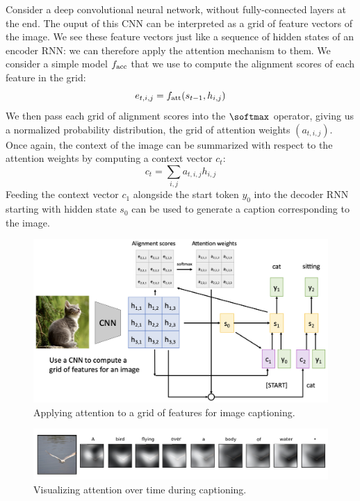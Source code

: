 Consider a deep convolutional neural network, without fully-connected layers at the end. The ouput of this CNN can be interpreted as a grid of feature vectors of the image. We see these feature vectors just like a sequence of hidden states of an encoder RNN: we can therefore apply the attention mechanism to them. We consider a simple model $f_{\textnormal{acc}}$ that we use to compute the alignment scores of each feature in the grid:
\begin{equation*}
    e_{t,i,j} = f_{\textnormal{att}}(s_{t-1}, h_{i,j})
\end{equation*}
We then pass each grid of alignment scores into the $\softmax$ operator, giving us a normalized probability distribution, the grid of attention weights $(a_{t,i,j})$. Once again, the context of the image can be summarized with respect to the attention weights by computing a context vector $c_t$:
\begin{equation*}
    c_t = \sum_{i,j} a_{t,i,j} h_{i,j}
\end{equation*} 
Feeding the context vector $c_1$ alongside the start token $y_0$ into the decoder RNN starting with hidden state $s_0$ can be used to generate a caption corresponding to the image.
\begin{figure}[H]
    \centering
    \includegraphics[width=.9\textwidth]{images/attention-cnn.png}
    \caption{Applying attention to a grid of features for image captioning.}
\end{figure}

\begin{figure}[H]
    \centering
    \includegraphics[width=\textwidth]{images/attention-bird.png}
    \caption{Visualizing attention over time during captioning.\protect\footnotemark}
\end{figure}

